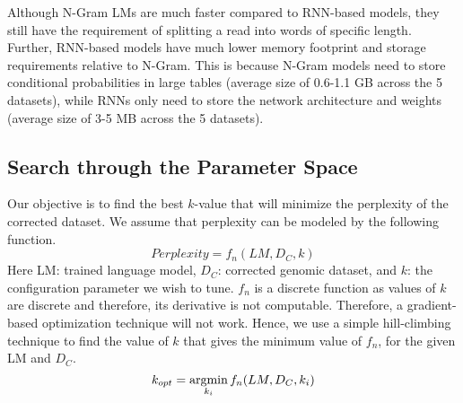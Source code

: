 Although N-Gram LMs are much faster compared to RNN-based models, they still have the requirement of splitting a read into words of specific length.
Further, RNN-based models have much lower memory footprint and storage requirements relative to N-Gram. This is because N-Gram models need to store conditional probabilities in large tables (average size of 0.6-1.1 GB across the 5 datasets), while RNNs only need to store the network architecture and  weights (average size of 3-5 MB across the 5 datasets). 

\subsection{Search through the Parameter Space}
Our objective is to find the best $k$-value that will minimize the perplexity of the corrected dataset. We assume that perplexity can be modeled by the following function.
\begin{equation}
Perplexity = f_{n}(LM, D_C, k)
\end{equation} 
Here LM: trained language model, $D_C$: corrected genomic dataset, and $k$: the configuration parameter we wish to tune.
$f_{n}$ is a discrete function as values of $k$ are discrete and therefore, its derivative is not computable. Therefore, a gradient-based optimization technique will not work. Hence, we use a simple hill-climbing technique to find the value of $k$ that gives the minimum value of $f_n$, for the given LM and $D_C$.
\begin{equation}
  k_{opt} = \operatorname*{argmin}_{k_i} f_{n}(LM, D_C, k_i)
\end{equation} 

